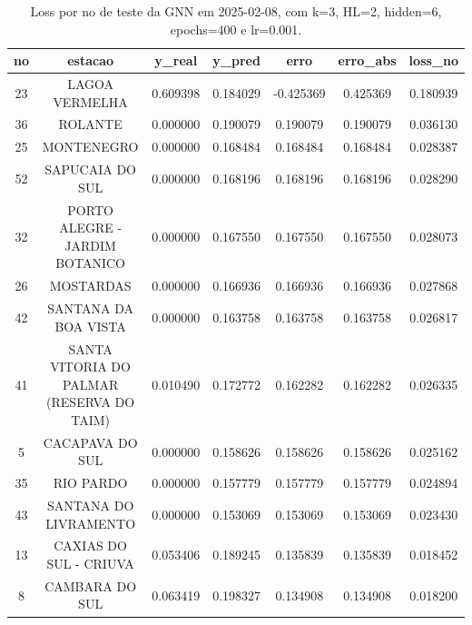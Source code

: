 \begin{table}[h]
\centering
\caption{Loss por no de teste da GNN em 2025-02-08, com k=3, HL=2, hidden=6, epochs=400 e lr=0.001.}
\label{tab:gnn_loss_k3_hl2_h6_e400_d20250208}
\begin{tabular}{ccccccc}
\toprule
no & estacao & y\_real & y\_pred & erro & erro\_abs & loss\_no \\
\midrule
23 & LAGOA VERMELHA & 0.609398 & 0.184029 & -0.425369 & 0.425369 & 0.180939 \\
36 & ROLANTE & 0.000000 & 0.190079 & 0.190079 & 0.190079 & 0.036130 \\
25 & MONTENEGRO & 0.000000 & 0.168484 & 0.168484 & 0.168484 & 0.028387 \\
52 & SAPUCAIA DO SUL & 0.000000 & 0.168196 & 0.168196 & 0.168196 & 0.028290 \\
32 & PORTO ALEGRE - JARDIM BOTANICO & 0.000000 & 0.167550 & 0.167550 & 0.167550 & 0.028073 \\
26 & MOSTARDAS & 0.000000 & 0.166936 & 0.166936 & 0.166936 & 0.027868 \\
42 & SANTANA DA BOA VISTA & 0.000000 & 0.163758 & 0.163758 & 0.163758 & 0.026817 \\
41 & SANTA VITORIA DO PALMAR (RESERVA DO TAIM) & 0.010490 & 0.172772 & 0.162282 & 0.162282 & 0.026335 \\
5 & CACAPAVA DO SUL & 0.000000 & 0.158626 & 0.158626 & 0.158626 & 0.025162 \\
35 & RIO PARDO & 0.000000 & 0.157779 & 0.157779 & 0.157779 & 0.024894 \\
43 & SANTANA DO LIVRAMENTO & 0.000000 & 0.153069 & 0.153069 & 0.153069 & 0.023430 \\
13 & CAXIAS DO SUL - CRIUVA & 0.053406 & 0.189245 & 0.135839 & 0.135839 & 0.018452 \\
8 & CAMBARA DO SUL & 0.063419 & 0.198327 & 0.134908 & 0.134908 & 0.018200 \\
\bottomrule
\end{tabular}
\end{table}
